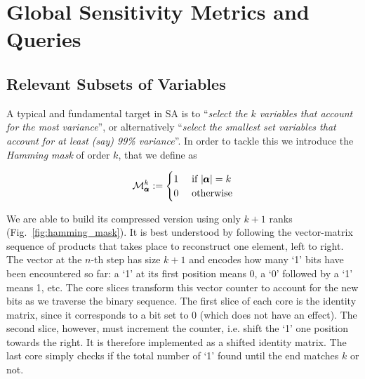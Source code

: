\documentclass[review, twocolumn]{svjour3}          %
\newcommand{\CHECK}[1]{{\color{GREEN}{\textbf{CHECK}: #1}}}
\begin{document}
\section{Global Sensitivity Metrics and Queries} \label{sec:other_indices}

\subsection{Relevant Subsets of Variables}

A typical and fundamental target in SA is to ``\emph{select the $k$ variables that account for the most variance}'', or alternatively ``\emph{select the smallest set variables that account for at least (say) 99\% variance}''. In order to tackle this we introduce the \emph{Hamming mask} of order $k$, that we define as

\begin{equation}
\mathcal{M}^k_{\pmb{\alpha}} :=
\begin{cases}
1 & \mbox{ if } |\pmb{\alpha}| = k \\
0 & \mbox{ otherwise}
\end{cases}
\end{equation}



We are able to build its compressed version using only $k+1$ ranks (Fig.~\ref{fig:hamming_mask}). It is best understood by following the vector-matrix sequence of products that takes place to reconstruct one element, left to right. The vector at the $n$-th step has size $k+1$ and encodes how many `1' bits have been encountered so far: a `1' at its first position means 0, a `0' followed by a `1' means 1, etc. The core slices transform this vector counter to account for the new bits as we traverse the binary sequence. The first slice of each core is the identity matrix, since it corresponds to a bit set to 0 (which does not have an effect). The second slice, however, must increment the counter, i.e. shift the `1' one position towards the right. It is therefore implemented as a shifted identity matrix. The last core simply checks if the total number of `1' found until the end matches $k$ or not.
\end{document}
